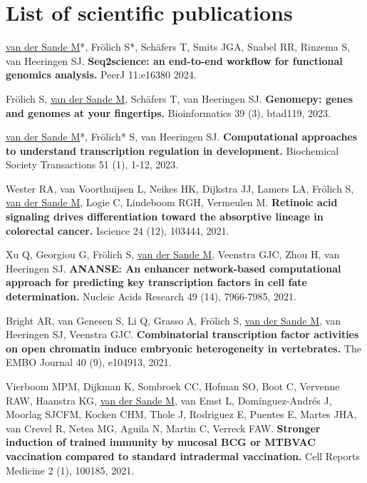 \section{List of scientific publications}

\noindent
\underline{van der Sande M}*, Frölich S*, Schäfers T, Smits JGA, Snabel RR, Rinzema S, van Heeringen SJ. \textbf{Seq2science: an end-to-end workflow for functional genomics analysis.} PeerJ 11:e16380 2024.
\newline

\noindent
Frölich S, \underline{van der Sande M}, Schäfers T, van Heeringen SJ. \textbf{Genomepy: genes and genomes at your fingertips.} Bioinformatics 39 (3), btad119, 2023. \cite{Frlich2023}
\newline

\noindent
\underline{van der Sande M}*, Frölich* S, van Heeringen SJ. \textbf{Computational approaches to understand transcription regulation in development.} Biochemical Society Transactions 51 (1), 1-12, 2023.
\newline

\noindent
Wester RA, van Voorthuijsen L, Neikes HK, Dijkstra JJ, Lamers LA, Frölich S, \underline{van der Sande M}, Logie C, Lindeboom RGH, Vermeulen M. \textbf{Retinoic acid signaling drives differentiation toward the absorptive lineage in colorectal cancer.} Iscience 24 (12), 103444, 2021.
\newline

\noindent
Xu Q, Georgiou G, Frölich S, \underline{van der Sande M}, Veenstra GJC, Zhou H, van Heeringen SJ. \textbf{ANANSE: An enhancer network-based computational approach for predicting key transcription factors in cell fate determination.} Nucleic Acids Research 49 (14), 7966-7985, 2021.
\newline

\noindent
Bright AR, van Genesen S, Li Q, Grasso A, Frölich S, \underline{van der Sande M}, van Heeringen SJ, Veenstra GJC.
\textbf{Combinatorial transcription factor activities on open chromatin induce embryonic heterogeneity in vertebrates.} The EMBO Journal 40 (9), e104913, 2021. 
\newline

\noindent
Vierboom MPM, Dijkman K, Sombroek CC, Hofman SO, Boot C, Vervenne RAW, Haanstra KG, \underline{van der Sande M}, van Emst L, Domínguez-Andrés J, Moorlag SJCFM, Kocken CHM, Thole J, Rodriguez E, Puentes E, Martes JHA, van Crevel R, Netea MG, Aguila N, Martin C, Verreck FAW. \textbf{Stronger induction of trained immunity by mucosal BCG or MTBVAC vaccination compared to standard intradermal vaccination.} Cell Reports Medicine 2 (1), 100185, 2021.
\newline

